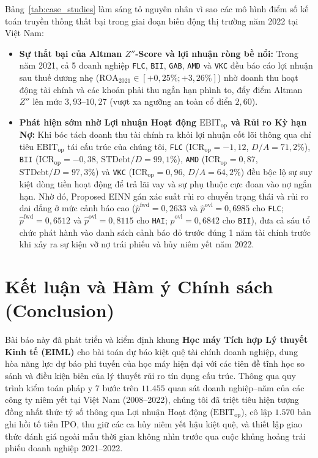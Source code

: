 \documentclass[11pt,a4paper]{article}
\begin{document}
Bảng~\ref{tab:case_studies} làm sáng tỏ nguyên nhân vì sao các mô hình điểm số kế toán truyền thống thất bại trong giai đoạn biến động thị trường năm 2022 tại Việt Nam:
\begin{itemize}
    \item \textbf{Sự thất bại của Altman $Z''$-Score và lợi nhuận ròng bề nổi:} Trong năm 2021, cả 5 doanh nghiệp \texttt{FLC}, \texttt{BII}, \texttt{GAB}, \texttt{AMD} và \texttt{VKC} đều báo cáo lợi nhuận sau thuế dương nhẹ ($\text{ROA}_{2021} \in [+0,25\%; +3,26\%]$) nhờ doanh thu hoạt động tài chính và các khoản phải thu ngắn hạn phình to, đẩy điểm Altman $Z''$ lên mức $3,93\text{--}10,27$ (vượt xa ngưỡng an toàn cổ điển $2,60$).
    \item \textbf{Phát hiện sớm nhờ Lợi nhuận Hoạt động $\text{EBIT}_{\text{op}}$ và Rủi ro Kỳ hạn Nợ:} Khi bóc tách doanh thu tài chính ra khỏi lợi nhuận cốt lõi thông qua chỉ tiêu $\text{EBIT}_{\text{op}}$ tái cấu trúc của chúng tôi, \texttt{FLC} ($\text{ICR}_{\text{op}} = -1,12$, $D/A = 71,2\%$), \texttt{BII} ($\text{ICR}_{\text{op}} = -0,38$, $\text{STDebt}/D = 99,1\%$), \texttt{AMD} ($\text{ICR}_{\text{op}} = 0,87$, $\text{STDebt}/D = 97,3\%$) và \texttt{VKC} ($\text{ICR}_{\text{op}} = 0,96$, $D/A = 64,2\%$) đều bộc lộ sự suy kiệt dòng tiền hoạt động để trả lãi vay và sự phụ thuộc cực đoan vào nợ ngắn hạn. Nhờ đó, Proposed EINN gán xác suất rủi ro chuyển trạng thái và rủi ro dai dẳng ở mức cảnh báo cao ($\hat{p}^{\text{fwd}} = 0,2633$ và $\hat{p}^{\text{ovl}} = 0,6985$ cho \texttt{FLC}; $\hat{p}^{\text{fwd}} = 0,6512$ và $\hat{p}^{\text{ovl}} = 0,8115$ cho \texttt{HAI}; $\hat{p}^{\text{ovl}} = 0,6842$ cho \texttt{BII}), đưa cả sáu tổ chức phát hành vào danh sách cảnh báo đỏ trước đúng 1 năm tài chính trước khi xảy ra sự kiện vỡ nợ trái phiếu và hủy niêm yết năm 2022.
\end{itemize}

\section{Kết luận và Hàm ý Chính sách (Conclusion)}
\label{sec:conclusion}

Bài báo này đã phát triển và kiểm định khung \textbf{Học máy Tích hợp Lý thuyết Kinh tế (EIML)} cho bài toán dự báo kiệt quệ tài chính doanh nghiệp, dung hòa năng lực dự báo phi tuyến của học máy hiện đại với các tiên đề tĩnh học so sánh và điều kiện biên của lý thuyết rủi ro tín dụng cấu trúc. Thông qua quy trình kiểm toán pháp y 7 bước trên $11.455$ quan sát doanh nghiệp--năm của các công ty niêm yết tại Việt Nam (2008--2022), chúng tôi đã triệt tiêu hiện tượng đồng nhất thức tỷ số thông qua Lợi nhuận Hoạt động ($\text{EBIT}_{\text{op}}$), cô lập $1.570$ bản ghi hồi tố tiền IPO, thu giữ các ca hủy niêm yết hậu kiệt quệ, và thiết lập giao thức đánh giá ngoài mẫu thời gian không nhìn trước qua cuộc khủng hoảng trái phiếu doanh nghiệp 2021--2022.
\end{document}
